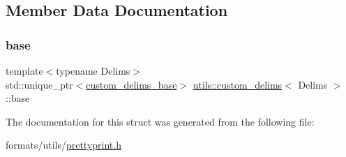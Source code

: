 \subsection{Member Data Documentation}
\mbox{\label{structutils_1_1custom__delims_ad5ba1984e29c022e1e7b76f60c41b109}} 
\subsubsection{\texorpdfstring{base}{base}}
{\footnotesize\ttfamily template$<$typename Delims$>$ \\
std\+::unique\+\_\+ptr$<$\mbox{\hyperlink{structutils_1_1custom__delims__base}{custom\+\_\+delims\+\_\+base}}$>$ \mbox{\hyperlink{structutils_1_1custom__delims}{utils\+::custom\+\_\+delims}}$<$ Delims $>$\+::base}



The documentation for this struct was generated from the following file\+:\begin{DoxyCompactItemize}
\item 
formats/utils/\mbox{\hyperlink{prettyprint_8h}{prettyprint.\+h}}\end{DoxyCompactItemize}
